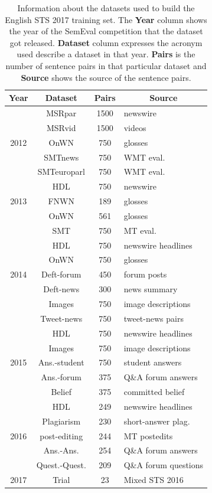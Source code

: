 \begin{enumerate}
 \begin{table}[ht!]
 	\centering
 	\begin{tabular}{c|c|c|l}
 		\hline
 		\multicolumn{1}{c|}{\textbf{Year}} & 
 		\multicolumn{1}{c|}{\textbf{Dataset}} & 
 		\multicolumn{1}{c|}{\textbf{Pairs}} & 
 		\multicolumn{1}{c}{\textbf{Source}} \\
 		\hline
 		 & MSRpar & 1500 & newswire \\
 		 & MSRvid & 1500 & videos \\
 		2012 \cite{agirre-etal-2012-semeval} & OnWN & 750 & glosses \\
 		 & SMTnews & 750 & WMT eval. \\
 		 & SMTeuroparl & 750 & WMT eval. \\
 		\hline
 		 & HDL & 750 & newswire \\
 		2013 \cite{agirre-etal-2013-sem} & FNWN & 189 & glosses \\
 		 & OnWN & 561 & glosses \\
 		 & SMT & 750 & MT eval. \\
 		\hline
 		 & HDL & 750 & newswire headlines \\
 		 & OnWN & 750 & glosses \\
 		2014 \cite{agirre-etal-2014-semeval} & Deft-forum & 450 & forum posts \\
 		 & Deft-news & 300 & news summary \\
 		 & Images & 750 & image descriptions \\
 		 & Tweet-news & 750 & tweet-news pairs \\
 		\hline
 		 & HDL & 750 & newswire headlines \\
 		 & Images & 750 & image descriptions \\
 		2015 \cite{agirre-etal-2015-semeval} & Ans.-student & 750 & student answers \\
 		 & Ans.-forum & 375 & Q\&A forum answers \\
 		 & Belief & 375 & committed belief \\
 		\hline
 		 & HDL & 249 & newswire headlines \\
 		 & Plagiarism & 230 & short-answer plag. \\
 		2016 \cite{agirre-etal-2016-semeval} & post-editing & 244 & MT postedits \\
 		 & Ans.-Ans. & 254 & Q\&A forum answers \\
 		 & Quest.-Quest. & 209 & Q\&A forum questions \\
 		\hline
 		2017 \cite{cer-etal-2017-semeval} & Trial & 23 & Mixed STS 2016 \\
 		\hline
 	\end{tabular}
 	\caption[Information about English STS 2017 training set]{Information about the datasets used to build the English STS 2017 training set. The \textbf{Year} column shows the year of the SemEval competition that the dataset got released. \textbf{Dataset} column expresses the acronym used describe a dataset in that year. \textbf{Pairs} is the number of sentence pairs in that particular dataset and \textbf{Source} shows the source of the sentence pairs. }
 	\label{tab:englishdata_info}
 \end{table}


\end{enumerate}
